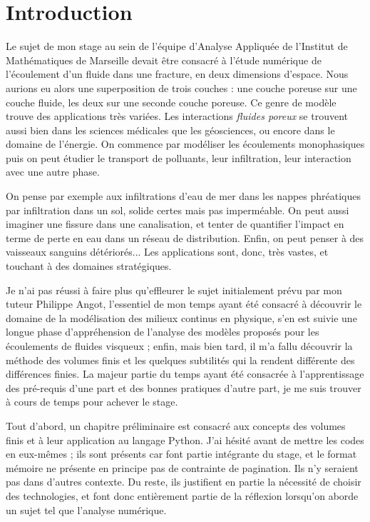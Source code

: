 
\chapter*{Introduction}

Le sujet de mon stage au sein de l'équipe d'Analyse Appliquée de l'Institut de Mathématiques de Marseille devait être consacré à l'étude numérique de l'écoulement d'un fluide dans une fracture, en deux dimensions d'espace. Nous aurions eu alors une superposition de trois couches : une couche poreuse sur une couche fluide, les deux sur une seconde couche poreuse. Ce genre de modèle trouve des applications très variées. Les interactions \textit{fluides poreux} se trouvent aussi bien dans les sciences médicales que les géosciences, ou encore dans le domaine de l'énergie. On commence par modéliser les écoulements monophasiques puis on peut étudier le transport de polluants, leur infiltration, leur interaction avec une autre phase. 

On pense par exemple aux infiltrations d'eau de mer dans les nappes phréatiques par infiltration dans un sol, solide certes mais pas imperméable. On peut aussi imaginer une fissure dans une canalisation, et tenter de quantifier l'impact en terme de perte en eau dans un réseau de distribution. Enfin, on peut penser à des vaisseaux sanguins détériorés... Les applications sont, donc, très vastes, et touchant à des domaines stratégiques.

Je n'ai pas réussi à faire plus qu'effleurer le sujet initialement prévu par mon tuteur Philippe Angot, l'essentiel de mon temps ayant été consacré à découvrir le domaine de la modélisation des milieux continus en physique, s'en est suivie une longue phase d'appréhension de l'analyse des modèles proposés pour les écoulements de fluides visqueux ; enfin, mais bien tard, il m'a fallu découvrir la méthode des volumes finis et les quelques subtilités qui la rendent différente des différences finies. La majeur partie du temps ayant été consacrée à l'apprentissage des pré-requis d'une part et des bonnes pratiques d'autre part, je me suis trouver à cours de temps pour achever le stage.

Tout d'abord, un chapitre préliminaire est consacré aux concepts des volumes finis et à leur application au langage Python. J'ai hésité avant de mettre les codes en eux-mêmes ; ils sont présents car font partie intégrante du stage, et le format mémoire ne présente en principe pas de contrainte de pagination. Ils n'y seraient pas dans d'autres contexte. Du reste, ils justifient en partie la nécessité de choisir des technologies, et font donc entièrement partie de la réflexion lorsqu'on aborde un sujet tel que l'analyse numérique.

